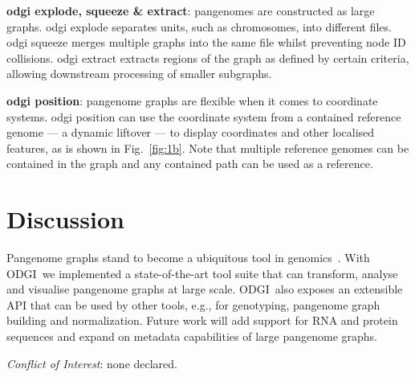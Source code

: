 \documentclass{bioinfo}
\newcommand{\odgi}{ODGI}
\newcommand{\cmd}[1]{\textrm{#1}}
\newcommand{\cmdbf}[1]{{\textbf{#1}}}
\newcommand{\topic}[1]{{\cmdbf{#1}}:}
\begin{document}
    \topic{odgi explode, squeeze \& extract} pangenomes are constructed
    as large graphs. \cmd{odgi explode} separates units, such as
    chromosomes, into different files. \cmd{odgi squeeze} merges
    multiple graphs into the same file whilst preventing node ID
    collisions. \cmd{odgi extract} extracts regions of the graph as
    defined by certain criteria, allowing downstream processing of
    smaller subgraphs.

    \topic{odgi position} pangenome graphs are flexible when it comes
    to coordinate systems. \cmd{odgi position} can use the coordinate
    system from a contained reference genome --- a dynamic liftover
    --- to display coordinates and other localised features, as is shown in
    Fig.~\ref{fig:1b}. Note that multiple reference genomes can be contained
    in the graph and any contained path can be used as a reference.



    \section{Discussion}

    Pangenome graphs stand to become a ubiquitous tool in
    genomics~\citep{Eizenga:2020}. With \odgi\ we implemented a
    state-of-the-art tool suite that can transform, analyse and
    visualise pangenome graphs at large scale. \odgi\ also exposes an
    extensible API that can be used by other tools, e.g., for
    genotyping, pangenome graph building and normalization.  Future
    work will add support for RNA and protein sequences and expand on
    metadata capabilities of large pangenome graphs.



%
%


    \textit{Conflict of Interest}: none declared.
    \vspace*{+24pt}
\end{document}
